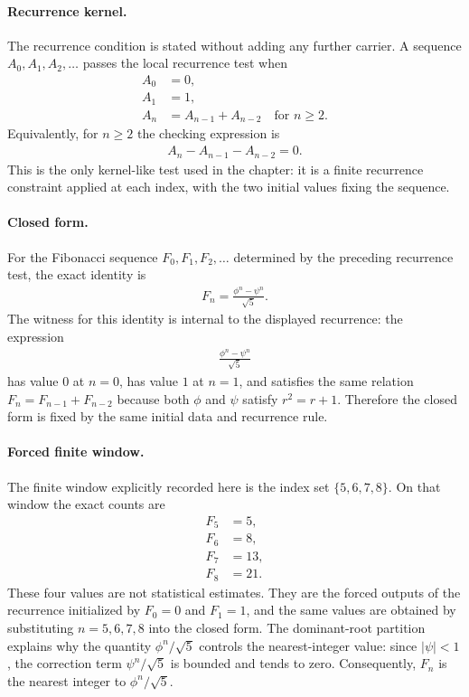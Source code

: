 \paragraph{Recurrence kernel.}
The recurrence condition is stated without adding any further carrier. A sequence $A_0,A_1,A_2,\ldots$ passes the local recurrence test when
$$
\begin{aligned}
A_0&=0,\\
A_1&=1,\\
A_n&=A_{n-1}+A_{n-2} \quad \text{for } n\geq 2.
\end{aligned}
$$
Equivalently, for $n\geq 2$ the checking expression is
$$
\begin{aligned}
A_n-A_{n-1}-A_{n-2}=0.
\end{aligned}
$$
This is the only kernel-like test used in the chapter: it is a finite recurrence constraint applied at each index, with the two initial values fixing the sequence.

\paragraph{Closed form.}
For the Fibonacci sequence $F_0,F_1,F_2,\ldots$ determined by the preceding recurrence test, the exact identity is
$$
\begin{aligned}
F_n=\frac{\phi^n-\psi^n}{\sqrt{5}}.
\end{aligned}
$$
The witness for this identity is internal to the displayed recurrence: the expression
$$
\begin{aligned}
\frac{\phi^n-\psi^n}{\sqrt{5}}
\end{aligned}
$$
has value $0$ at $n=0$, has value $1$ at $n=1$, and satisfies the same relation $F_n=F_{n-1}+F_{n-2}$ because both $\phi$ and $\psi$ satisfy $r^2=r+1$. Therefore the closed form is fixed by the same initial data and recurrence rule.

\paragraph{Forced finite window.}
The finite window explicitly recorded here is the index set $\{5,6,7,8\}$. On that window the exact counts are
$$
\begin{aligned}
F_5&=5,\\
F_6&=8,\\
F_7&=13,\\
F_8&=21.
\end{aligned}
$$
These four values are not statistical estimates. They are the forced outputs of the recurrence initialized by $F_0=0$ and $F_1=1$, and the same values are obtained by substituting $n=5,6,7,8$ into the closed form. The dominant-root partition explains why the quantity $\phi^n/\sqrt{5}$ controls the nearest-integer value: since $|\psi|<1$, the correction term $\psi^n/\sqrt{5}$ is bounded and tends to zero. Consequently, $F_n$ is the nearest integer to $\phi^n/\sqrt{5}$.

